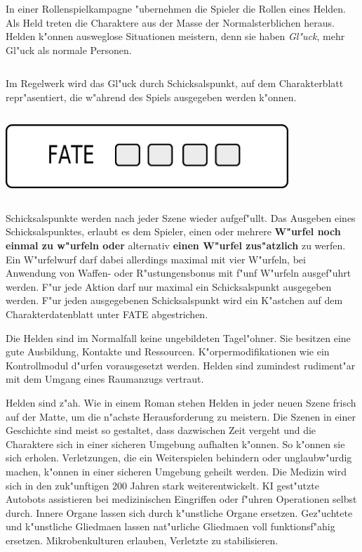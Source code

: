 
In einer Rollenspielkampagne "ubernehmen die Spieler die Rollen eines Helden. Als Held treten die Charaktere aus der Masse der Normalsterblichen heraus. Helden k"onnen ausweglose Situationen meistern, denn sie haben \emph{Gl"uck}, mehr Gl"uck als normale Personen. 

\begin{column}[l]{0.52}
    Im Regelwerk wird das Gl"uck durch Schicksalspunkt,  auf dem Charakterblatt repr"asentiert, die w"ahrend des Spiels ausgegeben werden k"onnen.
\end{column}
\begin{column}[r]{0.48}
    \centering
    \includegraphics[width=0.80\textwidth]{images/character_fate.png}    
\end{column}

Schicksalspunkte werden nach jeder Szene wieder aufgef"ullt. Das Ausgeben eines Schicksalspunktes, erlaubt es dem Spieler, einen oder mehrere \textbf{W"urfel noch einmal zu w"urfeln oder} alternativ \textbf{einen W"urfel zus"atzlich} zu werfen. Ein W"urfelwurf darf dabei allerdings maximal mit vier W"urfeln, bei Anwendung von Waffen- oder R"ustungensbonus mit f"unf W"urfeln ausgef"uhrt werden. F"ur jede Aktion darf nur maximal ein Schicksalspunkt ausgegeben werden. F"ur jeden ausgegebenen Schicksalspunkt wird ein K"astchen auf dem Charakterdatenblatt unter FATE abgestrichen.

Die Helden sind im Normalfall keine ungebildeten Tagel"ohner. Sie besitzen eine gute Ausbildung, Kontakte und Ressourcen. K"orpermodifikationen wie ein Kontrollmodul d"urfen vorausgesetzt werden. Helden sind zumindest rudiment"ar mit dem Umgang eines Raumanzugs vertraut.

Helden sind z"ah. Wie in einem Roman stehen Helden in jeder neuen Szene frisch auf der Matte, um die n"achste Herausforderung zu meistern. Die Szenen in einer Geschichte sind meist so gestaltet, dass dazwischen Zeit vergeht und die Charaktere sich in einer sicheren Umgebung aufhalten k"onnen. So k"onnen sie sich erholen. Verletzungen, die ein Weiterspielen behindern oder unglaubw"urdig machen, k"onnen in einer sicheren Umgebung geheilt werden. Die Medizin wird sich in den zuk"unftigen 200 Jahren stark weiterentwickelt. KI gest"utzte Autobots assistieren bei medizinischen Eingriffen oder f"uhren Operationen selbst durch. Innere Organe lassen sich durch k"unstliche Organe ersetzen. Gez"uchtete und k"unstliche Gliedma\3en lassen nat"urliche Gliedma\3en voll funktionsf"ahig ersetzen. Mikrobenkulturen erlauben, Verletzte zu stabilisieren.
